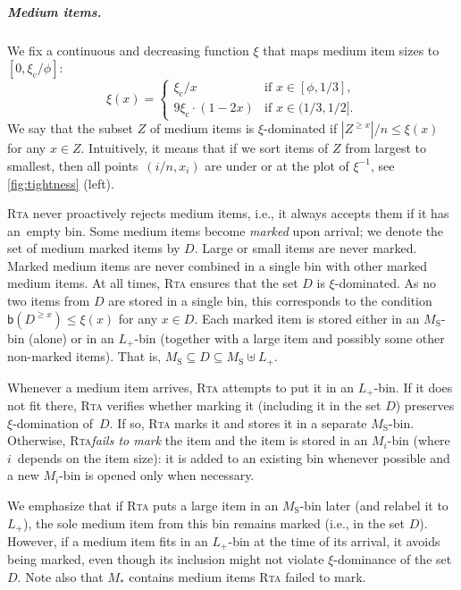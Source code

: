 \documentclass[a4paper,USenglish,cleveref]{lipics-v2019}
\newcommand{\M}{\ensuremath{M_\mathrm{S}}\xspace}
\newcommand{\MT}{\ensuremath{M_*}\xspace}
\newcommand{\MTI}[1]{\ensuremath{M_{#1}\xspace}}
\newcommand{\LT}{\ensuremath{L_+}\xspace}
\newcommand{\D}{\ensuremath{D}\xspace}
\newcommand{\smallBoundary}{\ensuremath{\phi}}
\newcommand{\gconst}{\ensuremath{\xi_\mathrm{c}}}
\newcommand{\g}{\ensuremath{\xi}}
\newcommand{\B}{\textsf{b}}
\newcommand{\ALG}{\textsc{Rta}\xspace}
\begin{document}
\subparagraph{Medium items.}

We fix a continuous and decreasing function $\g$ that maps medium item sizes 
to $[0,\gconst/\smallBoundary]$:
\begin{equation}
\label{eq:g-definition}
\g(x) =
\begin{cases}
  \gconst / x & \text{if $x \in [\smallBoundary,1/3]$}, \\
  9 \gconst \cdot (1-2 x) & \text{if $x \in (1/3,1/2]$}. 
\end{cases} 
\end{equation}
We say that the subset $Z$ of medium items is
$\g$-dominated if $|Z^{\geq x}| / n \leq \g(x)$ for any $x \in Z$.
Intuitively, it means that if we sort items of $Z$ from largest to
smallest, then all points~$(i/n, x_i)$ are under or at the plot of $\g^{-1}$,
see \cref{fig:tightness} (left). 

\ALG never proactively rejects medium items, i.e., it always accepts them if it 
has an~empty bin. Some medium items become \emph{marked} upon
arrival; we denote the set of medium marked items by $D$. Large or small items
are never marked. Marked medium items are never combined in a single bin with
other marked medium items. At all times, \ALG ensures that the set $D$ is
$\g$-dominated. As no two items from $D$ are stored in a single bin, this
corresponds to the condition $\B(D^{\geq x}) \leq \g(x)$ for any $x \in D$.
Each marked item is stored either in an $\M$-bin (alone) or in an $\LT$-bin (together 
with a large item and possibly some other non-marked items).
That is, $\M \subseteq \D \subseteq \M \uplus \LT$.

Whenever a medium item arrives, \ALG attempts to put it in an \LT-bin. If it
does not fit there, \ALG verifies whether marking it (including it in the set
$D$) preserves $\g$-domination of~$D$. If so, \ALG marks it and stores it in a
separate \M-bin. Otherwise, \ALG \emph{fails to mark} the item and the item is
stored in an $\MTI{i}$-bin (where $i$~depends on the item size): it is added to
an existing bin whenever possible and a new $\MTI{i}$-bin is opened only when
necessary.

We emphasize that if \ALG puts a large item in an \M-bin later (and relabel it
to \LT), the sole medium item from this bin remains marked (i.e., in the set $D$).
However, if a medium item fits in an \LT-bin at the time of its arrival, it
avoids being marked, even though its inclusion might not violate $\g$-dominance
of the set $D$. Note also that $\MT$ contains medium items \ALG failed to mark.
\end{document}

